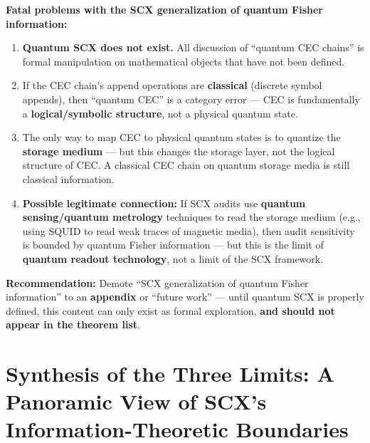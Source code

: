\documentclass[12pt,a4paper]{article}
\theoremstyle{plain}
\theoremstyle{definition}
\begin{document}
\begin{honestbox}
\textbf{Fatal problems with the SCX generalization of quantum Fisher information:}

\begin{enumerate}[leftmargin=*]
    \item \textbf{Quantum SCX does not exist.} All discussion of ``quantum CEC chains'' is formal manipulation on mathematical objects that have not been defined.
    \item If the CEC chain's append operations are \textbf{classical} (discrete symbol appends), then ``quantum CEC'' is a category error ---
    CEC is fundamentally a \textbf{logical/symbolic structure}, not a physical quantum state.
    \item The only way to map CEC to physical quantum states is to quantize the \textbf{storage medium} ---
    but this changes the storage layer, not the logical structure of CEC. A classical CEC chain on quantum storage media is still classical information.

    \item \textbf{Possible legitimate connection:} If SCX audits use \textbf{quantum sensing/quantum metrology} techniques
    to read the storage medium (e.g., using SQUID to read weak traces of magnetic media),
    then audit sensitivity is bounded by quantum Fisher information --- but this is the limit of \textbf{quantum readout technology},
    not a limit of the SCX framework.
\end{enumerate}

\textbf{Recommendation:} Demote ``SCX generalization of quantum Fisher information'' to an \textbf{appendix} or ``future work'' ---
until quantum SCX is properly defined, this content can only exist as formal exploration,
\textbf{and should not appear in the theorem list}.
\end{honestbox}

\section{Synthesis of the Three Limits: A Panoramic View of SCX's Information-Theoretic Boundaries}
\label{sec:synthesis}
\end{document}
